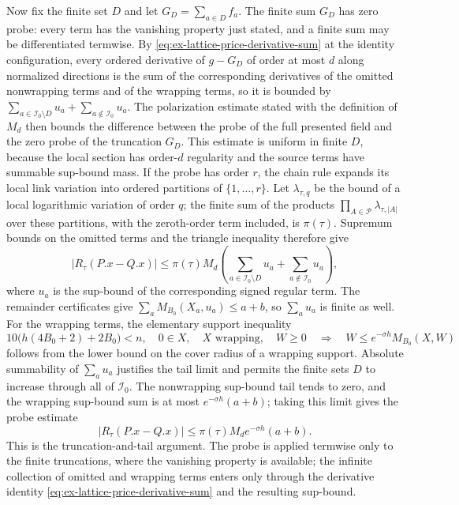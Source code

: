 Now fix the finite set \(D\) and let \(G_D=\sum_{a\in D}f_a\). The finite
sum \(G_D\) has zero probe: every term has the
vanishing property just stated, and a finite sum may be differentiated
termwise. By \eqref{eq:ex-lattice-price-derivative-sum} at the identity
configuration, every ordered derivative of \(g-G_D\) of order at most
\(d\) along normalized directions is the sum of the corresponding
derivatives of the omitted nonwrapping terms and of the wrapping terms, so
it is bounded by
\(\sum_{a\in\mathcal I_0\setminus D}u_a+\sum_{a\notin\mathcal I_0}u_a\).
The polarization estimate stated with the definition of \(M_d\) then bounds
the difference between the probe of the full presented
field and the zero probe of the truncation \(G_D\). This estimate is
uniform in finite \(D\), because the
local section has order-\(d\) regularity and the source terms have summable
sup-bound mass. If the probe has order \(r\), the chain rule expands its
local link variation into ordered partitions of \(\{1,\ldots,r\}\). Let
\(\lambda_{\tau,q}\) be the bound of a local logarithmic variation of
order \(q\); the finite sum of the products
\(\prod_{A\in\mathcal P}\lambda_{\tau,|A|}\) over these partitions,
with the zeroth-order term included, is \(\pi(\tau)\). Supremum bounds
on the omitted terms and the triangle inequality therefore give
\[
 |R_\tau(P.x-Q.x)|\leq\pi(\tau)M_d\left(
   \sum_{a\in\mathcal I_0\setminus D}u_a
   +\sum_{a\notin\mathcal I_0}u_a\right),
\]
where \(u_a\) is the sup-bound of the corresponding signed regular
term. The remainder certificates give \(\sum_a M_{B_0}(X_a,u_a)\leq a+b\),
so \(\sum_a u_a\) is finite as well. For the wrapping terms, the elementary support inequality
\[
 10\bigl(h(4B_0+2)+2B_0\bigr)<n,
 \quad 0\in X,\quad X\text{ wrapping},\quad W\geq0
 \quad\Longrightarrow\quad
 W\leq e^{-\sigma h}M_{B_0}(X,W)
\]
follows from the lower bound on the cover radius of a wrapping support.
Absolute summability of \(\sum_au_a\) justifies the tail limit and permits
the finite sets \(D\) to increase
through all of \(\mathcal I_0\). The nonwrapping
sup-bound tail tends to zero, and the wrapping sup-bound sum is at most
\(e^{-\sigma h}(a+b)\); taking this limit gives the probe estimate
\[
 |R_\tau(P.x-Q.x)|\leq\pi(\tau)M_d e^{-\sigma h}(a+b).
\]
This is the truncation-and-tail argument. The probe is applied termwise
only to the finite truncations, where the vanishing property is available;
the infinite collection of omitted and wrapping terms enters only through
the derivative identity \eqref{eq:ex-lattice-price-derivative-sum} and the
resulting sup-bound.

